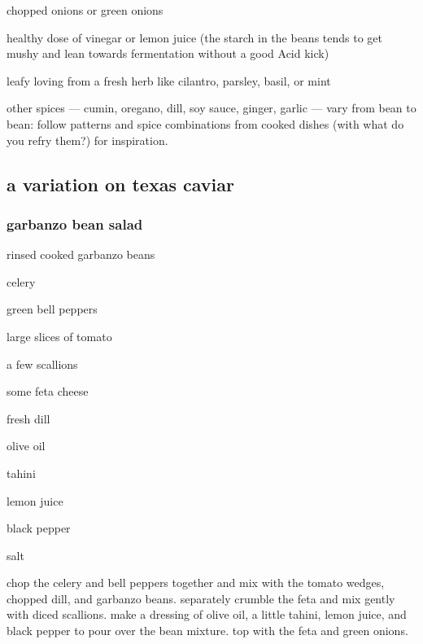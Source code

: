 \begin{ingredients}
  \item chopped onions or green onions

  \item healthy dose of vinegar or lemon juice (the starch in the
  beans tends to get mushy and lean towards fermentation without a
  good Acid kick)

  \item leafy loving from a fresh herb like cilantro, parsley, basil,
  or mint
\end{ingredients}

other spices --- cumin, oregano, dill, soy sauce, ginger, garlic ---
vary from bean to bean: follow patterns and spice combinations from
cooked dishes (with what do you refry them?) for inspiration.

\subsection{a variation on texas caviar}

\subsubsection{garbanzo bean salad}

\begin{ingredients}
  \item rinsed cooked garbanzo beans
  \begin{ingredients}
    \item celery
    \item green bell peppers
    \item large slices of tomato
  \end{ingredients}
  \item a few scallions
  \item some feta cheese
  \begin{ingredients}
    \item fresh dill
    \item olive oil
    \item tahini
    \item lemon juice
    \item black pepper
  \end{ingredients}
  \item salt
\end{ingredients}

chop the celery and bell peppers together and mix with the tomato
wedges, chopped dill, and garbanzo beans. separately crumble the feta
and mix gently with diced scallions. make a dressing of olive oil, a
little tahini, lemon juice, and black pepper to pour over the bean
mixture. top with the feta and green onions.

